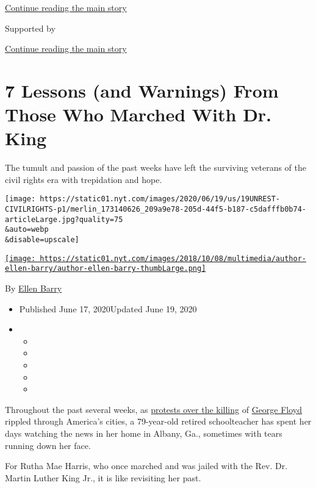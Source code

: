 \protect\hyperlink{after-top}{Continue reading the main story}

Supported by

\protect\hyperlink{after-sponsor}{Continue reading the main story}

\hypertarget{7-lessons-and-warnings-from-those-who-marched-with-dr-king}{%
\section{7 Lessons (and Warnings) From Those Who Marched With Dr.
King}\label{7-lessons-and-warnings-from-those-who-marched-with-dr-king}}

The tumult and passion of the past weeks have left the surviving
veterans of the civil rights era with trepidation and hope.

\texttt{[image: https://static01.nyt.com/images/2020/06/19/us/19UNREST-CIVILRIGHTS-p1/merlin\_173140626\_209a9e78-205d-44f5-b187-c5dafffb0b74-articleLarge.jpg?quality=75\\\&auto=webp\\\&disable=upscale]}

\href{https://www.nytimes.com/by/ellen-barry}{\texttt{[image: https://static01.nyt.com/images/2018/10/08/multimedia/author-ellen-barry/author-ellen-barry-thumbLarge.png]}}

By \href{https://www.nytimes.com/by/ellen-barry}{Ellen Barry}

\begin{itemize}
\item
  Published June 17, 2020Updated June 19, 2020
\item
  \begin{itemize}
  \item
  \item
  \item
  \item
  \item
  \end{itemize}
\end{itemize}

Throughout the past several weeks, as
\href{https://www.nytimes.com/news-event/george-floyd-protests-minneapolis-new-york-los-angeles}{protests
over the killing} of
\href{https://www.nytimes.com/article/george-floyd-who-is.html}{George
Floyd} rippled through America's cities, a 79-year-old retired
schoolteacher has spent her days watching the news in her home in
Albany, Ga., sometimes with tears running down her face.

For Rutha Mae Harris, who once marched and was jailed with the Rev. Dr.
Martin Luther King Jr., it is like revisiting her past.

